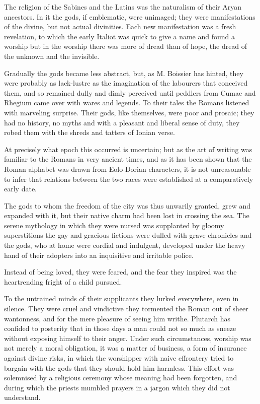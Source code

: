 \documentclass[]{book}
\begin{document}
The religion of the Sabines and the Latins was the naturalism of their
Aryan ancestors. In it the gods, if emblematic, were unimaged; they were
manifestations of the divine, but not actual divinities. Each new
manifestation was a fresh revelation, to which the early Italiot was
quick to give a name and found a worship but in the worship there was
more of dread than of hope, the dread of the unknown and the invisible.

Gradually the gods became less abstract, but, as M. Boissier has hinted,
they were probably as lack-lustre as the imagination of the labourers
that conceived them, and so remained dully and dimly perceived until
peddlers from Cumae and Rhegium came over with wares and legends. To
their tales the Romans listened with marveling surprise. Their gods,
like themselves, were poor and prosaic; they had no history, no myths
and with a pleasant and liberal sense of duty, they robed them with the
shreds and tatters of Ionian verse.

At precisely what epoch this occurred is uncertain; but as the art of
writing was familiar to the Romans in very ancient times, and as it has
been shown that the Roman alphabet was drawn from Eolo-Dorian
characters, it is not unreasonable to infer that relations between the
two races were established at a comparatively early date.

The gods to whom the freedom of the city was thus unwarily granted, grew
and expanded with it, but their native charm had been lost in crossing
the sea. The serene mythology in which they were nursed was supplanted
by gloomy superstitions the gay and gracious fictions were dulled with
grave chronicles and the gods, who at home were cordial and indulgent,
developed under the heavy hand of their adopters into an inquisitive and
irritable police.

Instead of being loved, they were feared, and the fear they inspired was
the heartrending fright of a child pursued.

To the untrained minds of their supplicants they lurked everywhere, even
in silence. They were cruel and vindictive they tormented the Roman out
of sheer wantonness, and for the mere pleasure of seeing him writhe.
Plutarch has confided to posterity that in those days a man could not so
much as sneeze without exposing himself to their anger. Under such
circumstances, worship was not merely a moral obligation, it was a
matter of business, a form of insurance against divine risks, in which
the worshipper with naive effrontery tried to bargain with the gods that
they should hold him harmless. This effort was solemnised by a religious
ceremony whose meaning had been forgotten, and during which the priests
mumbled prayers in a jargon which they did not understand.
\end{document}
